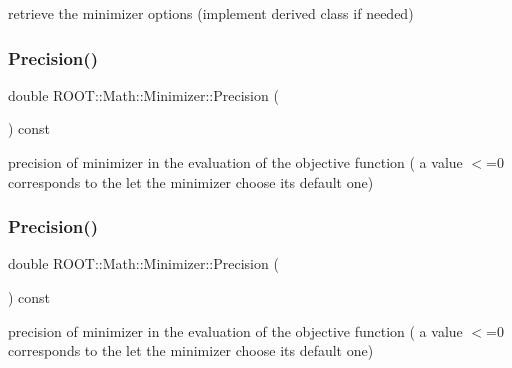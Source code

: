 retrieve the minimizer options (implement derived class if needed) 

\mbox{\label{classROOT_1_1Math_1_1Minimizer_a10c2c6ff21d1946c61639678435bbf4b}} 
\subsubsection{\texorpdfstring{Precision()}{Precision()}\hspace{0.1cm}{\footnotesize\ttfamily [1/3]}}
{\footnotesize\ttfamily double R\+O\+O\+T\+::\+Math\+::\+Minimizer\+::\+Precision (\begin{DoxyParamCaption}{ }\end{DoxyParamCaption}) const\hspace{0.3cm}{\ttfamily [inline]}}

precision of minimizer in the evaluation of the objective function ( a value $<$=0 corresponds to the let the minimizer choose its default one) \mbox{\label{classROOT_1_1Math_1_1Minimizer_a10c2c6ff21d1946c61639678435bbf4b}} 
\subsubsection{\texorpdfstring{Precision()}{Precision()}\hspace{0.1cm}{\footnotesize\ttfamily [2/3]}}
{\footnotesize\ttfamily double R\+O\+O\+T\+::\+Math\+::\+Minimizer\+::\+Precision (\begin{DoxyParamCaption}{ }\end{DoxyParamCaption}) const\hspace{0.3cm}{\ttfamily [inline]}}

precision of minimizer in the evaluation of the objective function ( a value $<$=0 corresponds to the let the minimizer choose its default one) \mbox{\label{classROOT_1_1Math_1_1Minimizer_a10c2c6ff21d1946c61639678435bbf4b}} 
